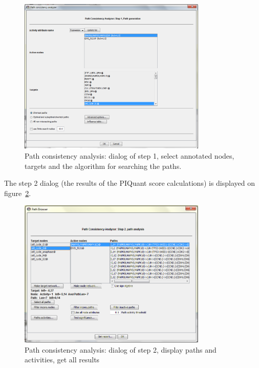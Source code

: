 \begin{figure}
  \centering
  \includegraphics[width=0.8\textwidth]{graphics/Path_consistency_analyser_Dialog1}
  \caption{Path consistency analysis: dialog of step 1, select annotated nodes,
targets and the algorithm for searching the paths.}
  \label{Path_consistency_analyser_Dialog1}
\end{figure}

The step 2 dialog (the results of the PIQuant score calculations) is displayed on figure~\ref{Path_consistency_analyser_Dialog2}.



\begin{figure}
  \centering
  \includegraphics[width=0.8\textwidth]{graphics/Path_consistency_analyser_Dialog2}
  \caption{Path consistency analysis: dialog of step 2, display paths and
activities, get all results}
  \label{Path_consistency_analyser_Dialog2}
\end{figure}  


